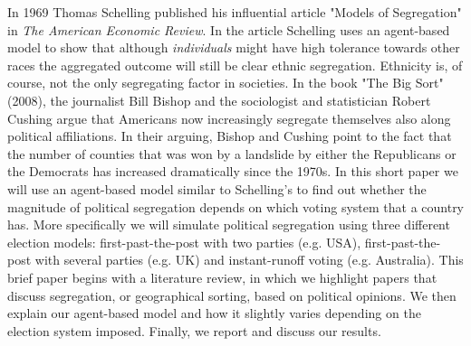 \documentclass[12pt, a4paper]{article}
\begin{document}
In 1969 Thomas Schelling published his influential article "Models of Segregation" in \textit{The American Economic Review}. In the article Schelling uses an agent-based model to show that although \textit{individuals} might have high tolerance towards other races the aggregated outcome will still be clear ethnic segregation. Ethnicity is, of course, not the only segregating factor in societies. In the book "The Big Sort" (2008),     the journalist Bill Bishop and the sociologist and statistician Robert Cushing argue that Americans now increasingly segregate themselves also along political affiliations. In their arguing, Bishop and Cushing point to the fact that the number of counties that was won by a landslide by either the Republicans or the Democrats has increased dramatically since the 1970s. 
\newline In this short paper we will use an agent-based model similar to Schelling's to find out whether the magnitude of political segregation depends on which voting system that a country has. More specifically we will simulate political segregation using three different election models: first-past-the-post with two parties (e.g. USA), first-past-the-post with several parties (e.g. UK) and instant-runoff voting (e.g. Australia). This brief paper begins with a literature review, in which we highlight papers that discuss segregation, or geographical sorting, based on political opinions. We then explain our agent-based model and how it slightly varies depending on the election system imposed. Finally, we report and discuss our results.


\end{document}
